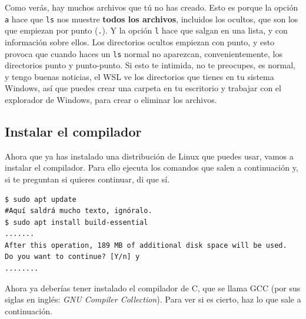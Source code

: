 \documentclass[a4paper]{article}
\begin{document}
Como verás, hay muchos archivos que tú no has creado. Esto es porque la opción
\verb!a! hace que \verb!ls! nos muestre \textbf{todos los archivos}, incluidos
los ocultos, que son los que empiezan por punto (\verb!.!). Y la opción \verb!l!
hace que salgan en una lista, y con información sobre ellos. Los directorios
ocultos empiezan con punto, y esto provoca que cuando haces un \verb!ls! normal
no aparezcan, convenientemente, los directorios punto y punto-punto.
Si esto te intimida, no te preocupes, es normal, y tengo buenas noticias, el WSL
ve los directorios que tienes en tu sistema Windows, así que puedes crear una
carpeta en tu escritorio y trabajar con el explorador de Windows, para crear
o eliminar los archivos.

\subsection{Instalar el compilador}
Ahora que ya has instalado una distribución de Linux que puedes usar, vamos
a instalar el compilador. Para ello ejecuta los comandos que salen a
continuación y, si te preguntan si quieres continuar, di que sí.

\noindent
\begin{minipage}[H]{\linewidth}
\mbox{}
\begin{lstlisting}[style=terminalStyle]
$ sudo apt update
#Aquí saldrá mucho texto, ignóralo.
$ sudo apt install build-essential
.......
After this operation, 189 MB of additional disk space will be used.
Do you want to continue? [Y/n] y
........
\end{lstlisting}
\end{minipage}



Ahora ya deberías tener instalado el compilador de C, que se llama GCC (por
sus siglas en inglés: \textit{GNU Compiler Collection}).
Para ver si es cierto, haz lo que sale a continuación.
\end{document}
